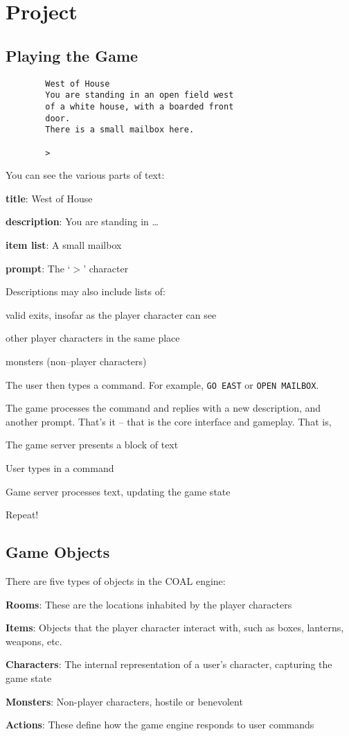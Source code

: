 \documentclass{article}
\newcommand{\enterProblemHeader}[1]{
}
\newcommand{\exitProblemHeader}[1]{
\nobreak\extramarks{#1}{}\nobreak
}
\newcounter{homeworkProblemCounter} %
\newcommand{\homeworkProblemName}{}
\newenvironment{homeworkProblem}[1][Problem \arabic{homeworkProblemCounter}]{ %
\stepcounter{homeworkProblemCounter} %
\renewcommand{\homeworkProblemName}{#1} %
\section{\homeworkProblemName} %
\enterProblemHeader{\homeworkProblemName} %
}{
\exitProblemHeader{\homeworkProblemName} %
}
\newcommand{\homeworkSectionName}{}
\newenvironment{homeworkSection}[1]{ %
\renewcommand{\homeworkSectionName}{#1} %
\subsection{\homeworkSectionName} %
\enterProblemHeader{\homeworkProblemName\ [\homeworkSectionName]} %
}{
\enterProblemHeader{\homeworkProblemName} %
}
\begin{document}
\begin{homeworkProblem}[Project]
\begin{homeworkSection}{Playing the Game}
	\begin{verbatim}
		West of House
		You are standing in an open field west
		of a white house, with a boarded front
		door.
		There is a small mailbox here.

		>
	\end{verbatim}

	You can see the various parts of text:
	\begin{compactitem}
		\item \textbf{title}: West of House
		\item \textbf{description}: You are standing in \dots
		\item \textbf{item list}: A small mailbox
		\item \textbf{prompt}: The `$>$' character
	\end{compactitem}

	Descriptions may also include lists of:

	\begin{compactitem}
		\item valid exits, insofar as the player character can see
		\item other player characters in the same place
		\item monsters (non--player characters)
	\end{compactitem}
	
	The user then types a command. For example, \texttt{GO EAST} or \texttt{OPEN MAILBOX}.
	
	The game processes the command and replies with a new description, and another prompt. That's it -- that is the core interface and gameplay. That is,

	\begin{compactitem}
		\item The game server presents a block of text
		\item User types in a command
		\item Game server processes text, updating the game state
		\item Repeat!
	\end{compactitem}
\end{homeworkSection}


\begin{homeworkSection}{Game Objects}
	There are five types of objects in the COAL engine:
	\begin{compactitem}
		\item \textbf{Rooms}: These are the locations inhabited by the player characters
		\item \textbf{Items}: Objects that the player character interact with, such as boxes, lanterns, weapons, etc.
		\item \textbf{Characters}: The internal representation of a user's character, capturing the game state
		\item \textbf{Monsters}: Non-player characters, hostile or benevolent
		\item \textbf{Actions}: These define how the game engine responds to user commands
	\end{compactitem}


\end{homeworkSection}
\end{homeworkProblem}
\end{document}
